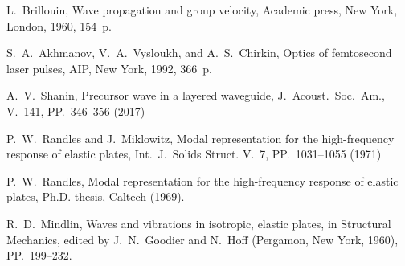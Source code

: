\documentclass[12pt]{article}
\begin{document}

\begin{thebibliography}{99}

L.~Brillouin, Wave propagation and group velocity, Academic press, New York, London,  1960, 154~p. 

S.~A.~Akhmanov, V.~A.~Vysloukh, and A.~S.~Chirkin, 
Optics of femtosecond laser pulses, AIP, New York, 1992, 366~p.

A.~V.~Shanin, Precursor wave in a layered waveguide,
J.~Acoust.\ Soc.~Am., V.~141, PP.~346--356 (2017)  

P.~W.~Randles and J.~Miklowitz, Modal representation 
for the high-frequency response of elastic plates,
Int.~J.\ Solids Struct. V.~7, PP.~1031--1055 (1971) 

P.~W.~Randles, 
Modal representation 
for the high-frequency response of elastic plates,
Ph.D. thesis, Caltech (1969).

R.~D.~Mindlin,
Waves and vibrations in isotropic, elastic plates, in
Structural Mechanics, edited by J.~N.~Goodier and N.~Hoff (Pergamon,
New York, 1960), PP.~199--232.


\end{thebibliography}
\end{document}
